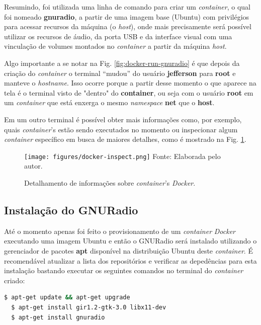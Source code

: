 \documentclass[
  12pt,				%
  openright,			%
  twoside,			%
  a4paper,			%
  english,			%
  french,				%
  spanish,			%
  brazil,				%
  ]{abntex2}
\begin{document}
Resumindo, foi utilizada uma linha de comando para criar um \textit{container}, o qual foi nomeado \textbf{gnuradio}, a partir de uma imagem base (Ubuntu) com
privilégios para acessar recursos da máquina (o \textit{host}), onde mais precisamente será possível utilizar os recursos de áudio, da porta USB e da
interface visual com uma vinculação de volumes montados no \textit{container} a partir da máquina \textit{host}.

Algo importante a se notar na Fig. \ref{fig:docker-run-gnuradio} é que depois da criação do \textit{container} o terminal “mudou” do usuário \textbf{jefferson} para \textbf{root}
e manteve o \textit{hostname}. Isso ocorre porque a partir desse momento o que aparece na tela é o terminal visto de "dentro"
do \textbf{container}, ou seja com o usuário \textbf{root} em um \textit{container} que está enxerga o mesmo \textit{namespace} \textbf{net} que o \textbf{host}.

Em um outro terminal é possível obter mais informações como, por exemplo, quais \textit{container}'s estão sendo executados no momento ou inspecionar algum
\textit{container} específico em busca de maiores detalhes, como é mostrado na Fig. \ref{fig:docker-inspect}.

\begin{figure}[!htb]
  \centering
  \caption{Detalhamento de informações sobre \textit{container}’s \textit{Docker}.}
  \texttt{[image: figures/docker-inspect.png]}
  Fonte: Elaborada pelo autor.
  \label{fig:docker-inspect}
\end{figure}

\newpage
\subsection*{Instalação do GNURadio}

Até o momento apenas foi feito o provisionamento de um \textit{container} \textit{Docker} executando uma imagem Ubuntu e então o GNURadio será instalado utilizando
o gerenciador de pacotes \textbf{apt} disponível na distribuição Ubuntu deste \textit{container}. É recomendável atualizar a lista dos repositórios e verificar
as depedências para esta instalação bastando executar os seguintes comandos no terminal do \textit{container} criado:

\begin{lstlisting}[language=bash]
  $ apt-get update && apt-get upgrade
  $ apt-get install gir1.2-gtk-3.0 libx11-dev
  $ apt-get install gnuradio
\end{lstlisting}
\end{document}
